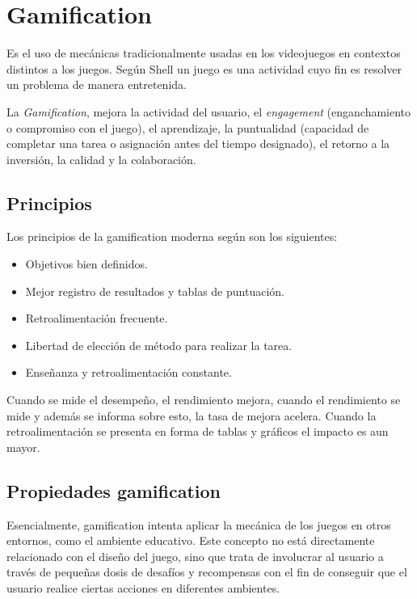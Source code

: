 \section{Gamification}
\label{sec:tics_GAMIFICATION}

Es el uso de mecánicas tradicionalmente usadas en los videojuegos en contextos distintos
a los juegos. Según Shell \cite{hj:gamification} un juego es una actividad cuyo fin es resolver un problema de manera entretenida. 

La \emph{Gamification}, mejora la actividad del usuario, el \emph{engagement} (enganchamiento o compromiso con el juego), el aprendizaje, la puntualidad (capacidad de completar una tarea o asignación antes del tiempo designado), el retorno a la inversión, la calidad y la colaboración.

\subsection{Principios}

Los principios de la gamification moderna según \cite{hj:gamification} son los 
siguientes:

\begin{itemize}
\item Objetivos bien definidos.
\item Mejor registro de resultados y tablas de puntuación.
\item Retroalimentación frecuente.
\item Libertad de elección de método para realizar la tarea.
\item Enseñanza y retroalimentación constante.
\end{itemize}

Cuando se mide el desempeño, el rendimiento mejora, cuando el rendimiento se mide y además se informa sobre esto, la tasa de mejora acelera. Cuando la retroalimentación se
presenta en forma de tablas y gráficos el impacto es aun mayor.

\subsection{Propiedades gamification}

Esencialmente, gamification intenta aplicar la mecánica de los juegos en otros entornos, como el ambiente educativo. Este concepto no está directamente relacionado con el diseño del juego, sino que trata de involucrar al usuario a través de pequeñas dosis de desafíos y recompensas con el fin de conseguir que el usuario realice ciertas acciones en diferentes ambientes\cite{breaking:gamification}.

